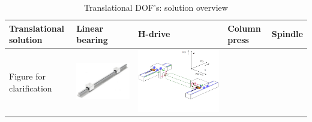 \begin{table}[h] \centering \caption{Translational DOF's: solution overview} \label{tab:transsolutions}
\begin{tabular}{p{3cm}|p{3cm}p{3cm}p{3cm}p{3cm}}
Translational solution   & Linear bearing \cite{lineartrans} & H-drive \cite{lecturesheets} & Column press \cite{TOXPRESSOTECHNIK4PRESSOTECHNIK} & Spindle\\ \hline
Figure for clarification &     
    \begin{minipage}{3cm}
      \includegraphics[width=\linewidth]{images/linear.png}
    \end{minipage} 
    &     
    \begin{minipage}{3cm}
      \includegraphics[width=\linewidth]{images/Hdrive}

\end{minipage}
\end{tabular}
\end{table}
